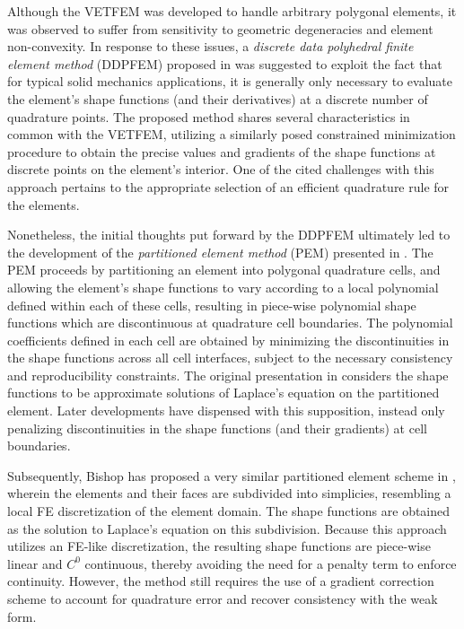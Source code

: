 		Although the VETFEM was developed to handle arbitrary polygonal elements, it was observed to suffer from sensitivity to geometric degeneracies and element non-convexity. In response to these issues, a \textit{discrete data polyhedral finite element method} (DDPFEM) proposed in \cite{Selimotic:08} was suggested to exploit the fact that for typical solid mechanics applications, it is generally only necessary to evaluate the element's shape functions (and their derivatives) at a discrete number of quadrature points. The proposed method shares several characteristics in common with the VETFEM, utilizing a similarly posed constrained minimization procedure to obtain the precise values and gradients of the shape functions at discrete points on the element's interior. One of the cited challenges with this approach pertains to the appropriate selection of an efficient quadrature rule for the elements.
			
		Nonetheless, the initial thoughts put forward by the DDPFEM ultimately led to the development of the \textit{partitioned element method} (PEM) presented in \cite{Rashid:12}. The PEM proceeds by partitioning an element into polygonal quadrature cells, and allowing the element's shape functions to vary according to a local polynomial defined within each of these cells, resulting in piece-wise polynomial shape functions which are discontinuous at quadrature cell boundaries. The polynomial coefficients defined in each cell are obtained by minimizing the discontinuities in the shape functions across all cell interfaces, subject to the necessary consistency and reproducibility constraints. The original presentation in \cite{Rashid:12} considers the shape functions to be approximate solutions of Laplace's equation on the partitioned element. Later developments have dispensed with this supposition, instead only penalizing discontinuities in the shape functions (and their gradients) at cell boundaries.
			
		Subsequently, Bishop has proposed a very similar partitioned element scheme in \cite{Bishop:14}, wherein the elements and their faces are subdivided into simplicies, resembling a local FE discretization of the element domain. The shape functions are obtained as the solution to Laplace's equation on this subdivision. Because this approach utilizes an FE-like discretization, the resulting shape functions are piece-wise linear and $C^0$ continuous, thereby avoiding the need for a penalty term to enforce continuity. However, the method still requires the use of a gradient correction scheme to account for quadrature error and recover consistency with the weak form.

